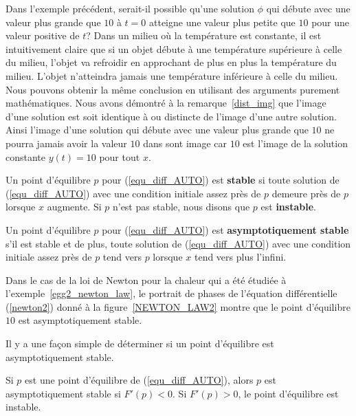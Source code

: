 {\begin{rmk}[\theory]
Dans l'exemple précédent, serait-il possible qu'une solution $\phi$
qui débute avec une valeur plus grande que $10$ à $t=0$ atteigne une
valeur plus petite que $10$ pour une valeur positive de $t$?  Dans un
milieu où la température est constante, il est intuitivement claire
que si un objet débute à une température supérieure à celle du milieu,
l'objet va refroidir en approchant de plus en plus la température du
milieu.  L'objet n'atteindra jamais une température inférieure à celle
du milieu.  Nous pouvons obtenir la même conclusion en utilisant des
arguments purement mathématiques.  Nous avons démontré à la
remarque~\ref{dist_img} que l'image d'une solution est soit identique
à ou distincte de l'image d'une autre solution.  Ainsi l'image d'une
solution qui débute avec une valeur plus grande que $10$ ne pourra
jamais avoir la valeur $10$ dans sont image car $10$ est l'image de la
solution constante $y(t) = 10$ pour tout $x$.
\end{rmk}

\begin{defn}
Un point d'équilibre $p$ pour (\ref{equ_diff_AUTO}) est
{\bfseries stable} si toute solution de (\ref{equ_diff_AUTO}) avec
une condition initiale assez près de $p$ demeure près de $p$ lorsque $x$
augmente.  Si $p$ n'est pas stable, nous disons que $p$ est
{\bfseries instable}.

Un point d'équilibre $p$ pour (\ref{equ_diff_AUTO}) est
{\bfseries asymptotiquement stable} s'il est
stable et de plus, toute solution de (\ref{equ_diff_AUTO}) avec une
condition initiale assez près de $p$ tend vers $p$ lorsque $x$ tend
vers plus l'infini.
\end{defn}

\begin{egg}
Dans le cas de la loi de Newton pour la chaleur qui a été étudiée à
l'exemple~\ref{egg2_newton_law}, le portrait de phases de l'équation
différentielle (\ref{newton2}) donné à la figure~\ref{NEWTON_LAW2}
montre que le point d'équilibre $10$ est asymptotiquement stable.
\end{egg}

Il y a une façon simple de déterminer si un point d'équilibre est
asymptotiquement stable.

\begin{theorem} \label{oneDstabth}
Si $p$ est une point d'équilibre de (\ref{equ_diff_AUTO}), alors $p$
est asymptotiquement stable si $F'(p)<0$.  Si $F'(p)>0$, le point
d'équilibre est instable.
\end{theorem}

}
